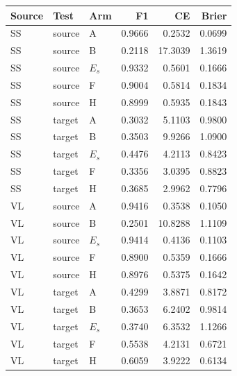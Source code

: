 \begin{tabular}{lllrrr}
\toprule
Source & Test & Arm & F1 & CE & Brier \\
\midrule
SS & source & A & 0.9666 & 0.2532 & 0.0699 \\
SS & source & B & 0.2118 & 17.3039 & 1.3619 \\
SS & source & $E_s$ & 0.9332 & 0.5601 & 0.1666 \\
SS & source & F & 0.9004 & 0.5814 & 0.1834 \\
SS & source & H & 0.8999 & 0.5935 & 0.1843 \\
SS & target & A & 0.3032 & 5.1103 & 0.9800 \\
SS & target & B & 0.3503 & 9.9266 & 1.0900 \\
SS & target & $E_s$ & 0.4476 & 4.2113 & 0.8423 \\
SS & target & F & 0.3356 & 3.0395 & 0.8823 \\
SS & target & H & 0.3685 & 2.9962 & 0.7796 \\
VL & source & A & 0.9416 & 0.3538 & 0.1050 \\
VL & source & B & 0.2501 & 10.8288 & 1.1109 \\
VL & source & $E_s$ & 0.9414 & 0.4136 & 0.1103 \\
VL & source & F & 0.8900 & 0.5359 & 0.1666 \\
VL & source & H & 0.8976 & 0.5375 & 0.1642 \\
VL & target & A & 0.4299 & 3.8871 & 0.8172 \\
VL & target & B & 0.3653 & 6.2402 & 0.9814 \\
VL & target & $E_s$ & 0.3740 & 6.3532 & 1.1266 \\
VL & target & F & 0.5538 & 4.2131 & 0.6721 \\
VL & target & H & 0.6059 & 3.9222 & 0.6134 \\
\bottomrule
\end{tabular}

